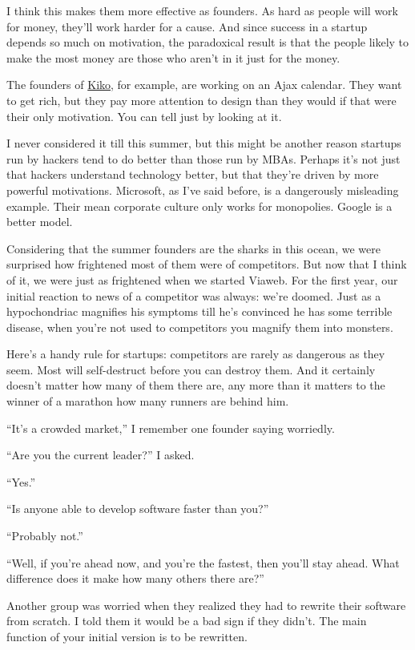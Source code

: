 I think this makes them more effective as founders. As hard as people
will work for money, they'll work harder for a cause. And since success
in a startup depends so much on motivation, the paradoxical result is
that the people likely to make the most money are those who aren't in it
just for the money.

The founders of \href{http://kiko.com}{Kiko}, for example, are working
on an Ajax calendar. They want to get rich, but they pay more attention
to design than they would if that were their only motivation. You can
tell just by looking at it.

I never considered it till this summer, but this might be another reason
startups run by hackers tend to do better than those run by MBAs.
Perhaps it's not just that hackers understand technology better, but
that they're driven by more powerful motivations. Microsoft, as I've
said before, is a dangerously misleading example. Their mean corporate
culture only works for monopolies. Google is a better model.

Considering that the summer founders are the sharks in this ocean, we
were surprised how frightened most of them were of competitors. But now
that I think of it, we were just as frightened when we started Viaweb.
For the first year, our initial reaction to news of a competitor was
always: we're doomed. Just as a hypochondriac magnifies his symptoms
till he's convinced he has some terrible disease, when you're not used
to competitors you magnify them into monsters.

Here's a handy rule for startups: competitors are rarely as dangerous as
they seem. Most will self-destruct before you can destroy them. And it
certainly doesn't matter how many of them there are, any more than it
matters to the winner of a marathon how many runners are behind him.

``It's a crowded market,'' I remember one founder saying worriedly.

``Are you the current leader?'' I asked.

``Yes.''

``Is anyone able to develop software faster than you?''

``Probably not.''

``Well, if you're ahead now, and you're the fastest, then you'll stay
ahead. What difference does it make how many others there are?''

Another group was worried when they realized they had to rewrite their
software from scratch. I told them it would be a bad sign if they
didn't. The main function of your initial version is to be rewritten.

